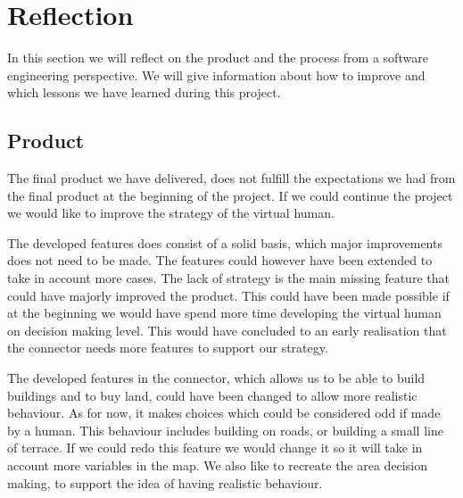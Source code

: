 \section{Reflection}
In this section we will reflect on the product and the process from a software engineering perspective. We will give information about how to improve and which lessons we have learned during this project.
\subsection{Product}
The final product we have delivered, does not fulfill the expectations we had from the final product at the beginning of the project. If we could continue the project we would like to improve the strategy of the virtual human.

The developed features does consist of a solid basis, which major improvements does not need to be made. The features could however have been extended to take in account more cases. The lack of strategy is the main missing feature that could have majorly improved the product. This could have been made possible if at the beginning we would have spend more time developing the virtual human on decision making level. This would have concluded to an early realisation that the connector needs more features to support our strategy.

The developed features in the connector, which allows us to be able to build buildings and to buy land, could have been changed to allow more realistic behaviour. As for now, it makes choices which could be considered odd if made by a human. This behaviour includes building on roads, or building a small line of terrace. If we could redo this feature we would change it so it will take in account more variables in the map. We also like to recreate the area decision making, to support the idea of having realistic behaviour.




